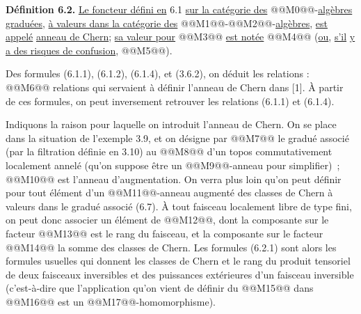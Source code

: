 
\textbf{Définition 6.2.} \uline{Le foncteur défini en} 6.1 \uline{sur la catégorie des} @@M0@@-\uline{algèbres} \uline{graduées}, \uline{à valeurs dans la catégorie des} @@M1@@-@@M2@@-\uline{algèbres}, \uline{est appelé} \uline{anneau de Chern}; \uline{sa valeur pour} @@M3@@ \uline{est notée} @@M4@@ (\uline{ou}, \uline{s'il} \uline{y a des risques de confusion}, @@M5@@).

Des formules (6.1.1), (6.1.2), (6.1.4), et (3.6.2), on déduit les relations :
@@M6@@
relations qui servaient à définir l'anneau de Chern dans [1]. À partir de ces formules, on peut inversement retrouver les relations (6.1.1) et (6.1.4).

Indiquons la raison pour laquelle on introduit l'anneau de Chern. On se place dans la situation de l'exemple 3.9, et on désigne par @@M7@@ le gradué associé (par la filtration définie en 3.10) au @@M8@@ d'un topos commutativement localement annelé (qu'on suppose être un @@M9@@-anneau pour simplifier)~; @@M10@@ est l'anneau d'augmentation. On verra plus loin qu'on peut définir pour tout élément d'un @@M11@@-anneau augmenté des classes de Chern à valeurs dans le gradué associé (6.7). À tout faisceau localement libre de type fini, on peut donc associer un élément de @@M12@@, dont la composante sur le facteur @@M13@@ est le rang du faisceau, et la composante sur le facteur @@M14@@ la somme des classes de Chern. Les formules (6.2.1) sont alors les formules usuelles qui donnent les classes de Chern et le rang du produit tensoriel de deux faisceaux inversibles et des puissances extérieures d'un faisceau inversible (c'est-à-dire que l'application qu'on vient de définir du @@M15@@ dans @@M16@@ est un @@M17@@-homomorphisme).


